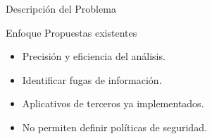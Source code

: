 \begin{frame}{Descripción del Problema}
\begin{block}{Enfoque Propuestas existentes}
\begin{itemize}
  \item Precisión y eficiencia del análisis.
  \item Identificar fugas de información. 
  \item Aplicativos de terceros ya implementados.
  \item No permiten definir políticas de seguridad.
\end{itemize}
\end{block}
\end{frame}
% 
% 
% 	
% 
